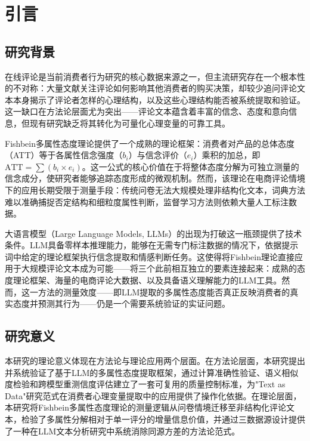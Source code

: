 \section{引言}

\subsection{研究背景}

在线评论是当前消费者行为研究的核心数据来源之一，但主流研究存在一个根本性的不对称：大量文献关注评论如何影响其他消费者的购买决策，却较少追问评论文本本身揭示了评论者怎样的心理结构，以及这些心理结构能否被系统提取和验证。这一缺口在方法论层面尤为突出——评论文本蕴含着丰富的信念、态度和意向信息，但现有研究缺乏将其转化为可量化心理变量的可靠工具。

Fishbein多属性态度理论\cite{fishbein1975}提供了一个成熟的理论框架：消费者对产品的总体态度（ATT）等于各属性信念强度（$b_i$）与信念评价（$e_i$）乘积的加总，即$\text{ATT} = \sum(b_i \times e_i)$。这一公式的核心价值在于将整体态度分解为可独立测量的信念成分，使研究者能够追踪态度形成的微观机制。然而，该理论在电商评论情境下的应用长期受限于测量手段：传统问卷无法大规模处理非结构化文本，词典方法难以准确捕捉否定结构和细粒度属性判断，监督学习方法则依赖大量人工标注数据\cite{grimmer2022}。

大语言模型（Large Language Models, LLMs）的出现为打破这一瓶颈提供了技术条件。LLM具备零样本推理能力，能够在无需专门标注数据的情况下，依据提示词中给定的理论框架执行信念提取和情感判断任务。这使得将Fishbein理论直接应用于大规模评论文本成为可能——将三个此前相互独立的要素连接起来：成熟的态度理论框架、海量的电商评论大数据、以及具备语义理解能力的LLM工具。然而，这一方法的测量效度——即LLM提取的多属性态度能否真正反映消费者的真实态度并预测其行为——仍是一个需要系统验证的实证问题。

\subsection{研究意义}

本研究的理论意义体现在方法论与理论应用两个层面。在方法论层面，本研究提出并系统验证了基于LLM的多属性态度提取框架，通过计算准确性验证、语义相似度检验和跨模型重测信度评估建立了一套可复用的质量控制标准，为"Text as Data"研究范式\cite{grimmer2022}在消费者心理变量提取中的应用提供了操作化依据。在理论层面，本研究将Fishbein多属性态度理论的测量逻辑从问卷情境迁移至非结构化评论文本，检验了多属性分解相对于单一评分的增量信息价值，并通过三数据源设计提供了一种在LLM文本分析研究中系统消除同源方差的方法论范式。

